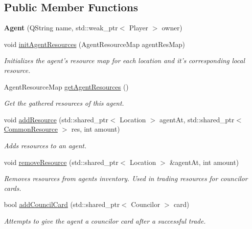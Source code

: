 \subsection*{Public Member Functions}
\begin{DoxyCompactItemize}
\item 
\hypertarget{class_interface_1_1_agent_a63c7e259716686510c08b633d9fdfc92}{{\bfseries Agent} (Q\-String name, std\-::weak\-\_\-ptr$<$ Player $>$ owner)}\label{class_interface_1_1_agent_a63c7e259716686510c08b633d9fdfc92}

\item 
void \hyperlink{class_interface_1_1_agent_a403a06332c0ae5c588a404421cca59d8}{init\-Agent\-Resources} (Agent\-Resource\-Map agent\-Res\-Map)
\begin{DoxyCompactList}\small\item\em Initializes the agent's resource map for each location and it's corresponding local resource. \end{DoxyCompactList}\item 
Agent\-Resource\-Map \hyperlink{class_interface_1_1_agent_a34e1a14d13db26b657431b7b81de7187}{get\-Agent\-Resources} ()
\begin{DoxyCompactList}\small\item\em Get the gathered resources of this agent. \end{DoxyCompactList}\item 
void \hyperlink{class_interface_1_1_agent_a2449f4ef7f986db93d39eb075528b914}{add\-Resource} (std\-::shared\-\_\-ptr$<$ Location $>$ agent\-At, std\-::shared\-\_\-ptr$<$ \hyperlink{class_interface_1_1_common_resource}{Common\-Resource} $>$ res, int amount)
\begin{DoxyCompactList}\small\item\em Adds resources to an agent. \end{DoxyCompactList}\item 
void \hyperlink{class_interface_1_1_agent_a340484fa874c0b503d23e3c4688f5632}{remove\-Resource} (std\-::shared\-\_\-ptr$<$ Location $>$ \&agent\-At, int amount)
\begin{DoxyCompactList}\small\item\em Removes resources from agents inventory. Used in trading resources for councilor cards. \end{DoxyCompactList}\item 
bool \hyperlink{class_interface_1_1_agent_ac9e69bf4e1056e4f1a71378420262928}{add\-Council\-Card} (std\-::shared\-\_\-ptr$<$ Councilor $>$ card)
\begin{DoxyCompactList}\small\item\em Attempts to give the agent a councilor card after a successful trade. \end{DoxyCompactList}\item 

\end{DoxyCompactItemize}
